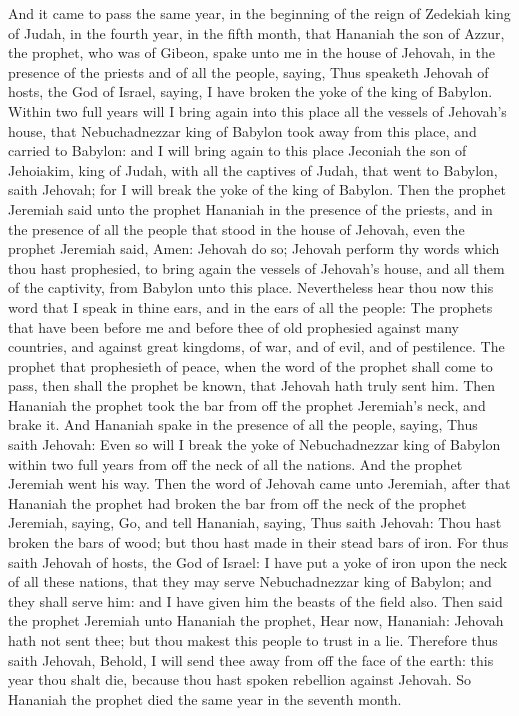 And it came to pass the same year, in the beginning of the reign of Zedekiah king of Judah, in the fourth year, in the fifth month, that Hananiah the son of Azzur, the prophet, who was of Gibeon, spake unto me in the house of Jehovah, in the presence of the priests and of all the people, saying, Thus speaketh Jehovah of hosts, the God of Israel, saying, I have broken the yoke of the king of Babylon. Within two full years will I bring again into this place all the vessels of Jehovah’s house, that Nebuchadnezzar king of Babylon took away from this place, and carried to Babylon: and I will bring again to this place Jeconiah the son of Jehoiakim, king of Judah, with all the captives of Judah, that went to Babylon, saith Jehovah; for I will break the yoke of the king of Babylon.  Then the prophet Jeremiah said unto the prophet Hananiah in the presence of the priests, and in the presence of all the people that stood in the house of Jehovah, even the prophet Jeremiah said, Amen: Jehovah do so; Jehovah perform thy words which thou hast prophesied, to bring again the vessels of Jehovah’s house, and all them of the captivity, from Babylon unto this place. Nevertheless hear thou now this word that I speak in thine ears, and in the ears of all the people: The prophets that have been before me and before thee of old prophesied against many countries, and against great kingdoms, of war, and of evil, and of pestilence. The prophet that prophesieth of peace, when the word of the prophet shall come to pass, then shall the prophet be known, that Jehovah hath truly sent him. Then Hananiah the prophet took the bar from off the prophet Jeremiah’s neck, and brake it. And Hananiah spake in the presence of all the people, saying, Thus saith Jehovah: Even so will I break the yoke of Nebuchadnezzar king of Babylon within two full years from off the neck of all the nations. And the prophet Jeremiah went his way.  Then the word of Jehovah came unto Jeremiah, after that Hananiah the prophet had broken the bar from off the neck of the prophet Jeremiah, saying, Go, and tell Hananiah, saying, Thus saith Jehovah: Thou hast broken the bars of wood; but thou hast made in their stead bars of iron. For thus saith Jehovah of hosts, the God of Israel: I have put a yoke of iron upon the neck of all these nations, that they may serve Nebuchadnezzar king of Babylon; and they shall serve him: and I have given him the beasts of the field also. Then said the prophet Jeremiah unto Hananiah the prophet, Hear now, Hananiah: Jehovah hath not sent thee; but thou makest this people to trust in a lie. Therefore thus saith Jehovah, Behold, I will send thee away from off the face of the earth: this year thou shalt die, because thou hast spoken rebellion against Jehovah. So Hananiah the prophet died the same year in the seventh month. 

